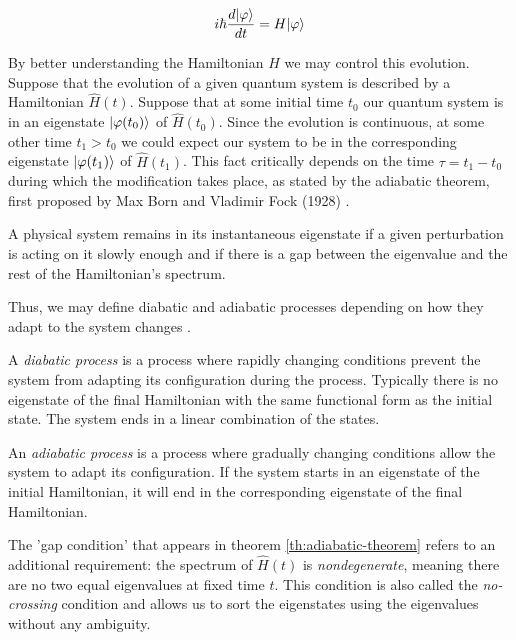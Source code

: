 $$ i \hbar \frac{d|\varphi\rangle}{dt} = H|\varphi\rangle $$

By better understanding the Hamiltonian $H$ we may control this evolution. Suppose that the evolution of a given quantum system is described by a Hamiltonian $\hat H(t)$. Suppose that at some initial time $t_0$ our quantum system is in an eigenstate $|\varphi(t_0)\rangle$ of $\hat H(t_0)$. Since the evolution is continuous, at some other time $t_1 > t_0$ we could expect our system to be in the corresponding eigenstate $|\varphi(t_1)\rangle$ of $\hat H(t_1)$. This fact critically depends on the time $\tau = t_1 - t_0$ during which the modification takes place, as stated by the adiabatic theorem, first proposed by Max Born and Vladimir Fock (1928) \cite{Born1928}.

\begin{theorem}
	\label{th:adiabatic-theorem}
	A physical system remains in its instantaneous eigenstate if a given perturbation is acting on it slowly enough and if there is a gap between the eigenvalue and the rest of the Hamiltonian's spectrum.
\end{theorem}

Thus, we may define diabatic and adiabatic processes depending on how they adapt to the system changes \cite{Kato1950}.

\begin{definition}
	A \emph{diabatic process} is a process where rapidly changing conditions prevent the system from adapting its configuration during the process. Typically there is no eigenstate of the final Hamiltonian with the same functional form as the initial state. The system ends in a linear combination of the states.
\end{definition}

\begin{definition}
	An \emph{adiabatic process} is a process where gradually changing conditions allow the system to adapt its configuration. If the system starts in an eigenstate of the initial Hamiltonian, it will end in the corresponding eigenstate of the final Hamiltonian.
\end{definition}

The 'gap condition' that appears in theorem \ref{th:adiabatic-theorem} refers to an additional requirement: the spectrum of $\hat H(t)$ is \emph{nondegenerate}, meaning there are no two equal eigenvalues at fixed time $t$. This condition is also called the \emph{no-crossing} condition and allows us to sort the eigenstates using the eigenvalues without any ambiguity.

